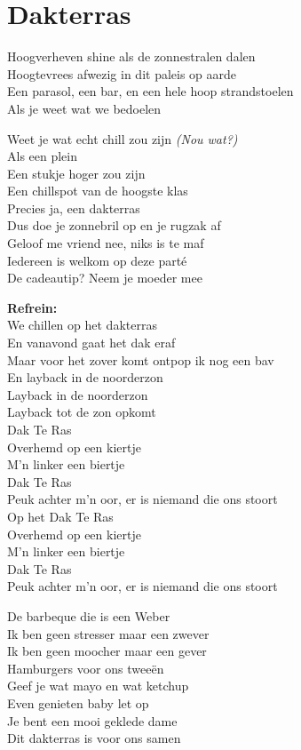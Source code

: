 \section{Dakterras}
Hoogverheven shine als de zonnestralen dalen\\
Hoogtevrees afwezig in dit paleis op aarde\\
Een parasol, een bar, en een hele hoop strandstoelen\\
Als je weet wat we bedoelen

Weet je wat echt chill zou zijn \textit{(Nou wat?)}\\
Als een plein\\
Een stukje hoger zou zijn\\
Een chillspot van de hoogste klas\\
Precies ja, een dakterras\\
Dus doe je zonnebril op en je rugzak af\\
Geloof me vriend nee, niks is te maf\\
Iedereen is welkom op deze parté\\
De cadeautip? Neem je moeder mee

\textbf{Refrein:}\\
We chillen op het dakterras\\
En vanavond gaat het dak eraf\\
Maar voor het zover komt ontpop ik nog een bav\\
En layback in de noorderzon\\
Layback in de noorderzon\\
Layback tot de zon opkomt\\
Dak Te Ras\\
Overhemd op een kiertje\\
M'n linker een biertje\\
Dak Te Ras\\
Peuk achter m'n oor, er is niemand die ons stoort\\
Op het Dak Te Ras\\
Overhemd op een kiertje\\
M'n linker een biertje\\
Dak Te Ras\\
Peuk achter m'n oor, er is niemand die ons stoort

De barbeque die is een Weber\\
Ik ben geen stresser maar een zwever\\
Ik ben geen moocher maar een gever\\
Hamburgers voor ons tweeën\\
Geef je wat mayo en wat ketchup\\
Even genieten baby let op\\
Je bent een mooi geklede dame\\
Dit dakterras is voor ons samen


